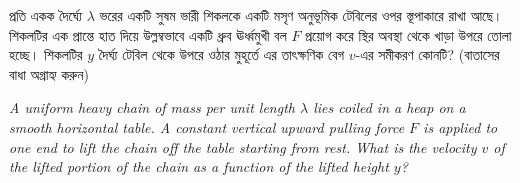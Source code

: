 \documentclass[12pt, a4paper]{article}
\begin{document}
\begin{tcolorbox}[questionbox={প্রশ্ন (Question) 1}]
\noindent
প্রতি একক দৈর্ঘ্যে $\lambda$ ভরের একটি সুষম ভারী শিকলকে একটি মসৃণ অনুভূমিক টেবিলের ওপর স্তূপাকারে রাখা আছে। শিকলটির এক প্রান্তে হাত দিয়ে উল্লম্বভাবে একটি ধ্রুব ঊর্ধ্বমুখী বল $F$ প্রয়োগ করে স্থির অবস্থা থেকে খাড়া উপরে তোলা হচ্ছে। শিকলটির $y$ দৈর্ঘ্য টেবিল থেকে উপরে ওঠার মুহূর্তে এর তাৎক্ষণিক বেগ $v$-এর সমীকরণ কোনটি? (বাতাসের বাধা অগ্রাহ্য করুন)

\vspace{0.8em}
\begin{english}
\noindent\textit{\color{darkgray}
A uniform heavy chain of mass per unit length $\lambda$ lies coiled in a heap on a smooth horizontal table. A constant vertical upward pulling force $F$ is applied to one end to lift the chain off the table starting from rest. What is the velocity $v$ of the lifted portion of the chain as a function of the lifted height $y$?
}
\end{english}
\end{tcolorbox}
\end{document}

